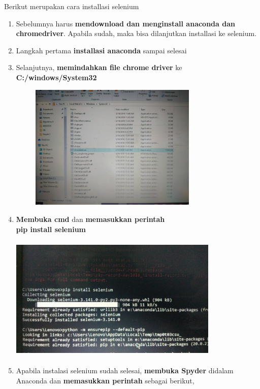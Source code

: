 \documentclass[a4paper, 12 pt]{article}
\begin{document}
        
            \par Berikut merupakan cara installasi selenium
		        \begin{enumerate}
                    \item Sebelumnya harus \textbf{mendownload dan menginstall anaconda dan chromedriver}. Apabila sudah, maka bisa dilanjutkan installasi ke selenium. 
                    \item Langkah pertama \textbf{installasi anaconda} sampai selesai
                    \item Selanjutnya, \textbf{memindahkan file chrome driver} ke \textbf{C:/windows/System32}
                        \begin{center}
		                    \includegraphics[width=10cm,height=6cm]{IMG20200403014414}
	                    \end{center}
                    \item \textbf{Membuka cmd} dan \textbf{memasukkan perintah} \\ \textbf{pip install selenium}
                        \begin{center}
		                    \includegraphics[width=10cm,height=6cm]{IMG-20200402-WA0051}
	                    \end{center}
                    \item Apabila instalasi selenium sudah selesai, \textbf{membuka Spyder} didalam Anaconda dan \textbf{memasukkan perintah} sebagai berikut, \\ \\

\end{enumerate}
\end{document}
